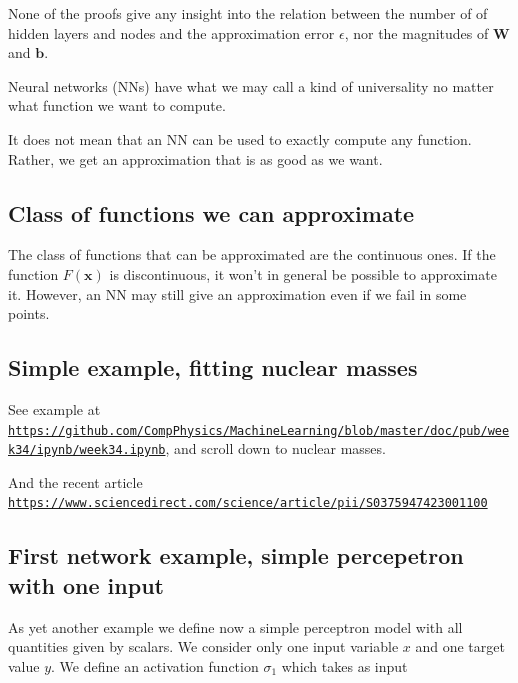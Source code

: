 \documentclass[%
oneside,                 %
final,                   %
10pt]{article}
\begin{document}
None of the proofs give any insight into the relation between the
number of of hidden layers and nodes and the approximation error
$\epsilon$, nor the magnitudes of $\bm{W}$ and $\bm{b}$.

Neural networks (NNs) have what we may call a kind of universality no matter what function we want to compute.

\begin{block}{}
It does not mean that an NN can be used to exactly compute any function. Rather, we get an approximation that is as good as we want. 
\end{block}

\subsection{Class of functions we can approximate}

\begin{block}{}
The class of functions that can be approximated are the continuous ones.
If the function $F(\bm{x})$ is discontinuous, it won't in general be possible to approximate it. However, an NN may still give an approximation even if we fail in some points.
\end{block}

\subsection{Simple example, fitting nuclear masses}

See example at \href{{https://github.com/CompPhysics/MachineLearning/blob/master/doc/pub/week34/ipynb/week34.ipynb}}{\nolinkurl{https://github.com/CompPhysics/MachineLearning/blob/master/doc/pub/week34/ipynb/week34.ipynb}}, and scroll down to nuclear masses.

And the recent article \href{{https://www.sciencedirect.com/science/article/pii/S0375947423001100}}{\nolinkurl{https://www.sciencedirect.com/science/article/pii/S0375947423001100}}

\subsection{First network example, simple percepetron with one input}

As yet another example we define now a simple perceptron model with
all quantities given by scalars. We consider only one input variable
$x$ and one target value $y$.  We define an activation function
$\sigma_1$ which takes as input
\end{document}

